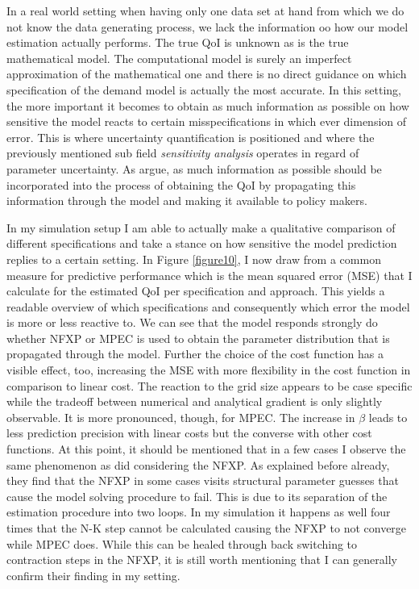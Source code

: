 In a real world setting when having only one data set at hand from which we do not know the data generating process, we lack the information oo how our model estimation actually performs. The true QoI is unknown as is the true mathematical model. The computational model is surely an imperfect approximation of the mathematical one and there is no direct guidance on which specification of the demand model is actually the most accurate. In this setting, the more important it becomes to obtain as much information as possible on how sensitive the model reacts to certain misspecifications in which ever dimension of error. This is where uncertainty quantification is positioned and where the previously mentioned sub field \textit{sensitivity analysis} operates in regard of parameter uncertainty. As \cite{Oberkampf.2010} argue, as much information as possible should be incorporated into the process of obtaining the QoI by propagating this information through the model and making it available to policy makers.

In my simulation setup I am able to actually make a qualitative comparison of different specifications and take a stance on how sensitive the model prediction replies to a certain setting. In Figure \ref{figure10}, I now draw from a common measure for predictive performance which is the mean squared error (MSE) that I calculate for the estimated QoI per specification and approach. This yields a readable overview of which specifications and consequently which error the model is more or less reactive to. We can see that the model responds strongly do whether NFXP or MPEC is used to obtain the parameter distribution that is propagated through the model. Further the choice of the cost function has a visible effect, too, increasing the MSE with more flexibility in the cost function in comparison to linear cost. The reaction to the grid size appears to be case specific while the tradeoff between numerical and analytical gradient is only slightly observable. It is more pronounced, though, for MPEC. The increase in $\beta$ leads to less prediction precision with linear costs but the converse with other cost functions. At this point, it should be mentioned that in a few cases I observe the same phenomenon as \cite{Dong.Hsieh.Zhang.2017} did considering the NFXP. As explained before already, they find that the NFXP in some cases visits structural parameter guesses that cause the model solving procedure to fail. This is due to its separation of the estimation procedure into two loops. In my simulation it happens as well four times that the N-K step cannot be calculated causing the NFXP to not converge while MPEC does. While this can be healed through back switching to contraction steps in the NFXP, it is still worth mentioning that I can generally confirm their finding in my setting.


